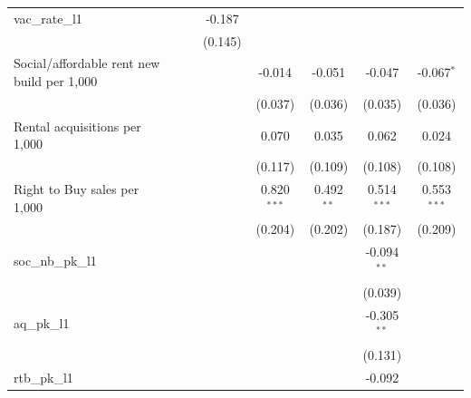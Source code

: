 \begin{table}[htbp]
\begin{tabular}{lccccccc}
      vac\_rate\_l1                              &                &                & -0.187         &                &                &               &   \\   
                                                 &                &                & (0.145)        &                &                &               &   \\   
      Social/affordable rent new build per 1,000 &                &                &                & -0.014         & -0.051         & -0.047        & -0.067$^{*}$\\   
                                                 &                &                &                & (0.037)        & (0.036)        & (0.035)       & (0.036)\\   
      Rental acquisitions per 1,000              &                &                &                & 0.070          & 0.035          & 0.062         & 0.024\\   
                                                 &                &                &                & (0.117)        & (0.109)        & (0.108)       & (0.108)\\   
      Right to Buy sales per 1,000               &                &                &                & 0.820$^{***}$  & 0.492$^{**}$   & 0.514$^{***}$ & 0.553$^{***}$\\   
                                                 &                &                &                & (0.204)        & (0.202)        & (0.187)       & (0.209)\\   
      soc\_nb\_pk\_l1                            &                &                &                &                &                & -0.094$^{**}$ &   \\   
                                                 &                &                &                &                &                & (0.039)       &   \\   
      aq\_pk\_l1                                 &                &                &                &                &                & -0.305$^{**}$ &   \\   
                                                 &                &                &                &                &                & (0.131)       &   \\   
      rtb\_pk\_l1                                &                &                &                &                &                & -0.092        &   \\   

\end{tabular}
\end{table}
